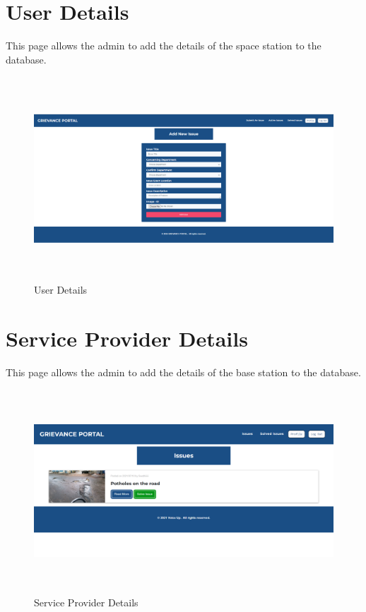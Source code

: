 \documentclass[12pt,a4paper]{report}
\begin{document}
\section{User Details}
This page allows the admin to add the details of the space station to the database.
\begin{figure}[hbtp]
\centering
\includegraphics[width=6in,height=3in]{user.png}
\caption{User Details}
\end{figure}
\vspace{0.10in}
\newpage
\section{Service Provider Details}
This page allows the admin to add the details of the base station to the database.
\begin{figure}[hbtp]
\centering
\includegraphics[width=6in,height=3in]{sp.png}
\caption{Service Provider Details}
\end{figure}
\end{document}
